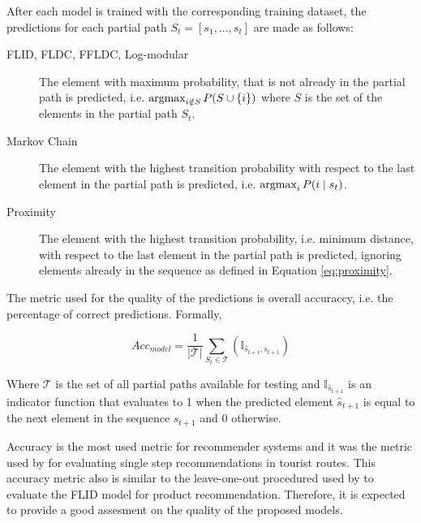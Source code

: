 After each model is trained with the corresponding training dataset, the predictions for each partial path $S_{t} = [s_{1}, \dots, s_{t}]$ are made as follows:

\begin{description}
  \item[FLID, FLDC, FFLDC, Log-modular] The element with maximum probability, that is not already in the partial path is predicted, i.e. $\operatorname*{argmax}_{i \notin S} P(S \cup \{i\})$ where $S$ is the set of the elements in the partial path $S_{t}$.
  \item[Markov Chain] The element with the highest transition probability with respect to the last element in the partial path is predicted, i.e. $\operatorname*{argmax}_{i} P(i \mid s_{t})$.
  \item[Proximity] The element with the highest transition probability, i.e. minimum distance, with respect to the last element in the partial path is predicted, ignoring elements already in the sequence as defined in Equation \eqref{eq:proximity}.
\end{description}

The metric used for the quality of the predictions is overall accuraccy, i.e. the percentage of correct predictions. Formally, 

\begin{equation}
  Acc_{model} = \frac{1}{|\mathcal{T}|}\sum_{S_{t} \in \mathcal{T}}(\mathbb{I}_{\hat{s}_{t+1}, s_{t+1}})
\end{equation}

Where $\mathcal{T}$ is the set of all partial paths available for testing and $\mathbb{I}_{\hat{s}_{t+1}}$ is an indicator function that evaluates to 1 when the predicted element $\hat{s}_{t+1}$ is equal to the next element in the sequence $s_{t+1}$ and 0 otherwise.

Accuracy is the most used metric for recommender systems \citep{Herlocker2004} and it was the metric used by \citet{Kurashima2010} for evaluating single step recommendations in tourist routes. This accuracy metric also is similar to the leave-one-out procedured used by \citet{tschiatschek16learning} to evaluate the FLID model for product recommendation. Therefore, it is expected to provide a good assesment on the quality of the proposed models.
